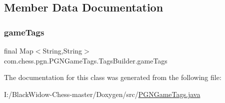 \subsection{Member Data Documentation}
\mbox{\label{classcom_1_1chess_1_1pgn_1_1_p_g_n_game_tags_1_1_tags_builder_a03b4355896f59dcb7043ebd00bb66126}} 
\subsubsection{\texorpdfstring{gameTags}{gameTags}}
{\footnotesize\ttfamily final Map$<$String,String$>$ com.\+chess.\+pgn.\+P\+G\+N\+Game\+Tags.\+Tags\+Builder.\+game\+Tags\hspace{0.3cm}{\ttfamily [package]}}



The documentation for this class was generated from the following file\+:\begin{DoxyCompactItemize}
\item 
I\+:/\+Black\+Widow-\/\+Chess-\/master/\+Doxygen/src/\mbox{\hyperlink{_p_g_n_game_tags_8java}{P\+G\+N\+Game\+Tags.\+java}}\end{DoxyCompactItemize}
